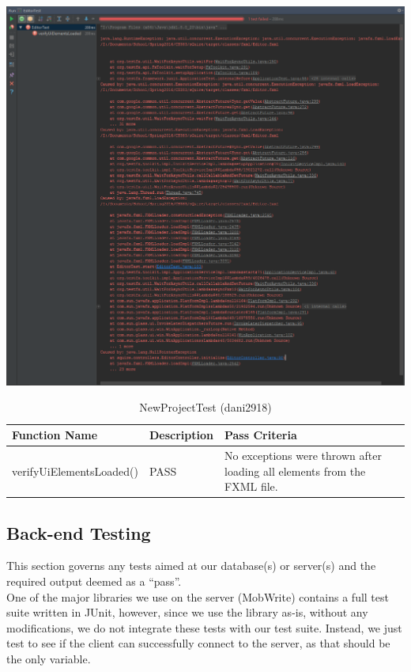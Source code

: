\documentclass[twoside,letterpaper]{article}
\begin{document}
\includegraphics[width=\textwidth]{images/TestPlan/EditorTestException} 

\begin{table}[h]
	\centering
	\caption{NewProjectTest (dani2918)}
	\begin{tabular}{|p{5cm}|p{3cm}|p{4cm}|}
		\hline
		\textbf{Function Name} & \textbf{Description} & \textbf{Pass Criteria}  \\\hline
		verifyUiElementsLoaded() & PASS & No exceptions were thrown after loading all elements from the FXML file. \\\hline
	\end{tabular}
\end{table}


\newpage
\subsection{Back-end Testing}

This section governs any tests aimed at our database(s) or server(s) and the required output deemed as a ``pass''. \\

One of the major libraries we use on the server (MobWrite) contains a full test suite written in JUnit, however, since we use the library as-is, without any modifications, we do not integrate these tests with our test suite. Instead, we just test to see if the client can successfully connect to the server, as that should be the only variable.
\end{document}
